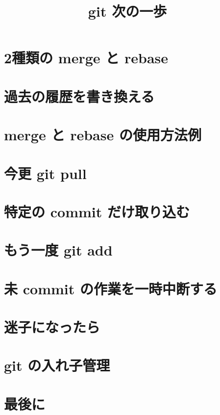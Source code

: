 \documentclass[dvipdfmx,slide,12pt]{beamer}
\title{git 次の一歩}
\begin{document}


\section{2種類の merge と rebase}



\section{過去の履歴を書き換える}


\section{merge と rebase の使用方法例}


\section{今更 git pull}


\section{特定の commit だけ取り込む}


\section{もう一度 git add}


\section{未 commit の作業を一時中断する}


\section{迷子になったら}


\section{git の入れ子管理}



\section{最後に}

\end{document}
